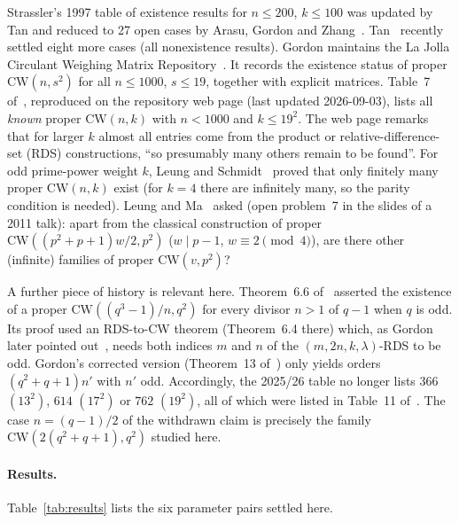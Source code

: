 \documentclass[11pt]{article}
\numberwithin{equation}{section}
\theoremstyle{definition}
\theoremstyle{remark}
\newcommand{\CW}{\mathrm{CW}}
\begin{document}
Strassler's 1997 table of existence results for $n\le200$, $k\le100$ was updated by Tan and
reduced to 27 open cases by Arasu, Gordon and Zhang~\cite{AGZ}. Tan~\cite{Tan26} recently
settled eight more cases (all nonexistence results).
Gordon maintains the La Jolla Circulant Weighing Matrix Repository~\cite{GordonRepo}. It records
the existence status of proper $\CW(n,s^2)$ for all $n\le1000$, $s\le19$, together with explicit
matrices.
Table~7 of~\cite{G26}, reproduced on the repository web page (last updated 2026-09-03), lists
all \emph{known} proper $\CW(n,k)$ with $n<1000$ and $k\le19^2$. The web page remarks that for
larger $k$ almost all entries come from the product or relative-difference-set (RDS)
constructions, ``so presumably many others remain to be found''.
For odd prime-power weight $k$, Leung and Schmidt~\cite{LS11} proved that only finitely many
proper $\CW(n,k)$ exist (for $k=4$ there are infinitely many, so the parity condition is needed).
Leung and Ma~\cite{Ma11} asked (open problem~7 in the slides of a 2011 talk): apart from the classical construction of proper
$\CW((p^2+p+1)w/2,p^2)$ ($w\mid p-1$, $w\equiv2\pmod 4$), are there other (infinite)
families of proper $\CW(v,p^2)$?

A further piece of history is relevant here. Theorem~6.6 of~\cite{AGZ} asserted the existence of a
proper $\CW((q^3-1)/n,q^2)$ for every divisor $n>1$ of $q-1$ when $q$ is odd. Its proof used an
RDS-to-CW theorem (Theorem~6.4 there) which, as Gordon later pointed out~\cite[Theorem~12]{G26},
needs both indices $m$ and $n$ of the $(m,2n,k,\lambda)$-RDS to be odd.
Gordon's corrected version (Theorem~13 of~\cite{G26}) only yields orders $(q^2+q+1)n'$ with $n'$
odd. Accordingly, the 2025/26 table no longer lists $366$ $(13^2)$, $614$ $(17^2)$ or $762$
$(19^2)$, all of which were listed in Table~11 of~\cite{AGZ}. The case $n=(q-1)/2$ of the
withdrawn claim is precisely the family $\CW(2(q^2+q+1),q^2)$ studied here.

\paragraph{Results.} Table~\ref{tab:results} lists the six parameter pairs settled here.
\end{document}
